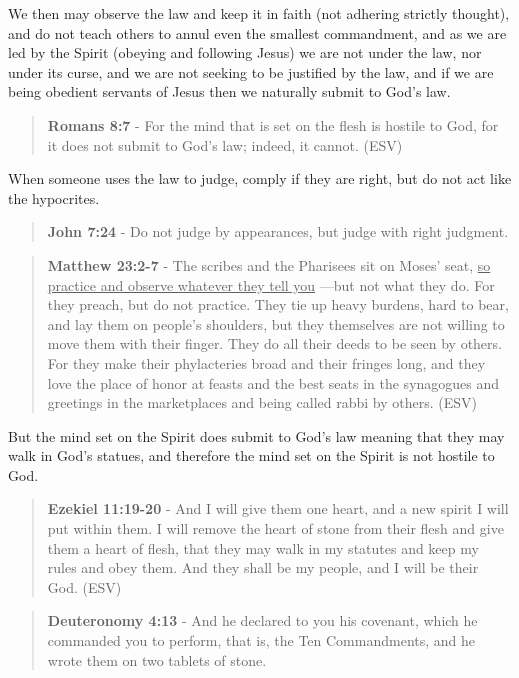 \documentclass[11pt]{article}
\begin{document}
We then may observe the law and keep it in faith (not adhering strictly thought), and do not teach others to annul even the smallest commandment, and as we are led by the Spirit (obeying and following Jesus) we are not under the law, nor under its curse, and we are not seeking to be justified by the law, and if we are being obedient servants of Jesus then we naturally submit to God's law.

\begin{quote}
\textbf{Romans 8:7} - For the mind that is set on the flesh is hostile to God, for it does not submit to God's law; indeed, it cannot. (ESV)
\end{quote}

When someone uses the law to judge, comply if they are right, but do not act like the hypocrites.

\begin{quote}
\textbf{John 7:24} - Do not judge by appearances, but judge with right judgment.
\end{quote}

\begin{quote}
\textbf{Matthew 23:2-7} - The scribes and the Pharisees sit on Moses' seat, \uline{so practice and observe whatever they tell you} —but not what they do. For they preach, but do not practice. They tie up heavy burdens, hard to bear, and lay them on people's shoulders, but they themselves are not willing to move them with their finger. They do all their deeds to be seen by others. For they make their phylacteries broad and their fringes long, and they love the place of honor at feasts and the best seats in the synagogues and greetings in the marketplaces and being called rabbi by others. (ESV)
\end{quote}

But the mind set on the Spirit does submit to God's law meaning that they may walk in God's statues, and therefore the mind set on the Spirit is not hostile to God.

\begin{quote}
\textbf{Ezekiel 11:19-20} - And I will give them one heart, and a new spirit I will put within them. I will remove the heart of stone from their flesh and give them a heart of flesh, that they may walk in my statutes and keep my rules and obey them. And they shall be my people, and I will be their God. (ESV)
\end{quote}

\begin{quote}
\textbf{Deuteronomy 4:13} - And he declared to you his covenant, which he commanded you to perform, that is, the Ten Commandments, and he wrote them on two tablets of stone.
\end{quote}
\end{document}
